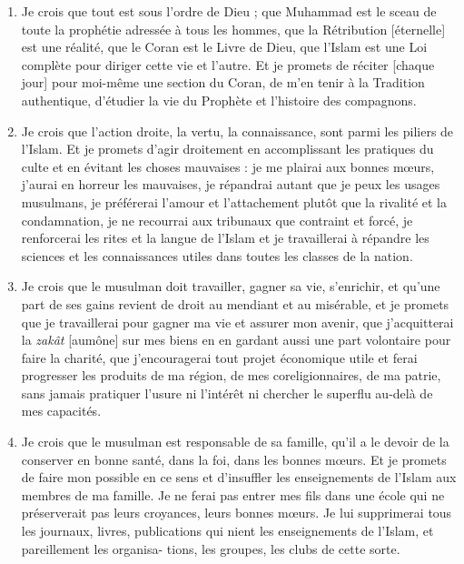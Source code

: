 \begin{enumerate}
 
\item
  
  Je crois que tout est sous l'ordre de Dieu ; que Muhammad est le sceau
  de toute la prophétie adressée à tous les hommes, que la Rétribution
  {[}éternelle{]} est une réalité, que le Coran est le Livre de Dieu,
  que l'Islam est une Loi complète pour diriger cette vie et l'autre. Et
  je promets de réciter {[}chaque jour{]} pour moi-même une section du
  Coran, de m'en tenir à la Tradition authentique, d'étudier la vie du
  Prophète et l'histoire des compagnons.
  
\item
  
  Je crois que l'action droite, la vertu, la connaissance, sont parmi
  les piliers de l'Islam. Et je promets d'agir droitement en
  accomplissant les pratiques du culte et en évitant les choses
  mauvaises : je me plairai aux bonnes mœurs, j'aurai en horreur les
  mauvaises, je répandrai autant que je peux les usages musulmans, je
  préférerai l'amour et l'attachement plutôt que la rivalité et la
  condamnation, je ne recourrai aux tribunaux que contraint et forcé, je
  renforcerai les rites et la langue de l'Islam et je travaillerai à
  répandre les sciences et les connaissances utiles dans toutes les
  classes de la nation.
  
\item
  
  Je crois que le musulman doit travailler, gagner sa vie, s'enrichir,
  et qu'une part de ses gains revient de droit au mendiant et au
  misérable, et je promets que je travaillerai pour gagner ma vie et
  assurer mon avenir, que j'acquitterai la \emph{zakât} {[}aumône{]} sur
  mes biens en en gardant aussi une part volontaire pour faire la
  charité, que j'encouragerai tout projet économique utile et ferai
  progresser les produits de ma région, de mes coreligionnaires, de ma
  patrie, sans jamais pratiquer l'usure ni l'intérêt ni chercher le
  superflu au-delà de mes capacités.
  
\item
  
  Je crois que le musulman est responsable de sa famille, qu'il a le
  devoir de la conserver en bonne santé, dans la foi, dans les bonnes
  mœurs. Et je promets de faire mon possible en ce sens et d'insuffler
  les enseignements de l'Islam aux membres de ma famille. Je ne ferai
  pas entrer mes fils dans une école qui ne préserverait pas leurs
  croyances, leurs bonnes mœurs. Je lui supprimerai tous les journaux,
  livres, publications qui nient les enseignements de l'Islam, et
  pareillement les organisa- tions, les groupes, les clubs de cette
  sorte.
  

\end{enumerate}
